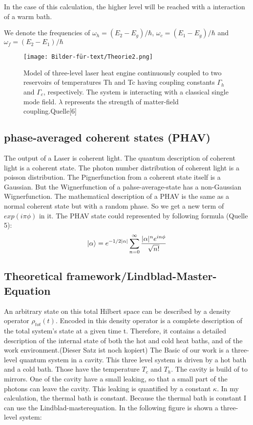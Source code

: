 \documentclass[12pt,a4paper]{article}
\DeclarePairedDelimiter\ket{\lvert}{\rangle}
\begin{document}
In the case of this calculation, the higher level will be reached with a interaction of a warm bath. 

We denote the frequencies of $\omega_h=(E_2-E_g)/\hbar$, $\omega_c=(E_1-E_g)/\hbar$ and $\omega_f=(E_2-E_1)/\hbar$
\begin{figure}[h!]
\centering
\texttt{[image: Bilder-für-text/Theorie2.png]}
\caption{Model of three-level laser heat engine
continuously coupled to two reservoirs of temperatures Th and
Tc having coupling constants $\Gamma_h$ and $\Gamma_c$, respectively. The
system is interacting with a classical single mode field. $\lambda$
represents the strength of matter-field coupling.Quelle[6]}
\end{figure}

\newpage
\subsection{phase-averaged coherent states (PHAV)}
The output of a Laser is coherent light.
The quantum description of coherent light is a coherent state. The photon number distribution of coherent light is a poisson distribution. 
The Pignerfunction from a coherent state itself is a Gaussian. But the Wignerfunction of a pahse-average-state has a non-Gaussian Wignerfunction. 
The mathematical description of a  PHAV is the same as a normal coherent state but with a random phase. So we get a new term of $exp(i\pi\phi)$ in it. 
The PHAV state could represented by following formula (Quelle 5):
\begin{equation}
\ket{\alpha}=e^{-1/2|\alpha|}\sum_{n=0}^{\infty}\frac{|\alpha|^n e^{in\phi}}{\sqrt{n!}}
\end{equation}
\subsection{Theoretical framework/Lindblad-Master-Equation} 
An arbitrary state on this total
Hilbert space can be described by a density operator $\rho_{tot}(t)$. Encoded in this density
operator is a complete description of the total system's state at a given time t. Therefore,
it contains a detailed description of the internal state of both the hot and cold heat baths,
and of the work environment.(Dieser Satz ist noch kopiert)
The Basic of our work is a three-level quantum system in a cavity. This three level system is driven by a hot bath and a cold bath. Those have the temperature $T_c$ and $T_h$. The cavity is build of to mirrors. One of the cavity have a small leaking, so that a small part of the photons can leave the cavity. This leaking is quantified by a constant $\kappa$.
In my calculation, the thermal bath is constant.
Because the thermal bath is constant I can use the Lindblad-masterequation. 
In the following figure is shown a three-level system:
\end{document}

